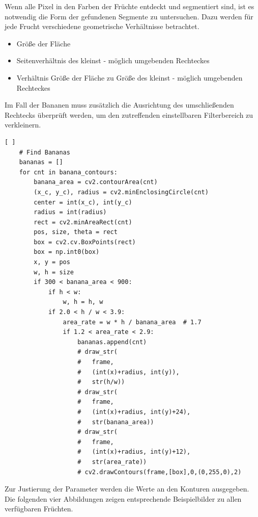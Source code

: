 Wenn alle Pixel in den Farben der Früchte entdeckt und segmentiert sind, ist es notwendig die Form der gefundenen Segmente zu untersuchen. Dazu werden für jede Frucht verschiedene geometrische Verhältnisse betrachtet.
\begin{itemize}
    \item Größe der Fläche
    \item Seitenverhältnis des kleinst - möglich umgebenden Rechteckes
    \item Verhältnis Größe der Fläche zu Größe des kleinst - möglich umgebenden Rechteckes
\end{itemize}
Im Fall der Bananen muss zusätzlich die Ausrichtung des umschließenden Rechtecks überprüft werden, um den zutreffenden einstellbaren Filterbereich zu verkleinern. 

\lstset{language=Python}
\begin{lstlisting}[ ]
    # Find Bananas
    bananas = []
    for cnt in banana_contours:
        banana_area = cv2.contourArea(cnt)
        (x_c, y_c), radius = cv2.minEnclosingCircle(cnt)
        center = int(x_c), int(y_c)
        radius = int(radius)
        rect = cv2.minAreaRect(cnt)
        pos, size, theta = rect
        box = cv2.cv.BoxPoints(rect)
        box = np.int0(box)
        x, y = pos
        w, h = size
        if 300 < banana_area < 900:
            if h < w:
                w, h = h, w
            if 2.0 < h / w < 3.9:
                area_rate = w * h / banana_area  # 1.7
                if 1.2 < area_rate < 2.9:
                    bananas.append(cnt)
                    # draw_str(
                    #   frame,
                    #   (int(x)+radius, int(y)),
                    #   str(h/w))
                    # draw_str(
                    #   frame,
                    #   (int(x)+radius, int(y)+24),
                    #   str(banana_area))
                    # draw_str(
                    #   frame,
                    #   (int(x)+radius, int(y)+12),
                    #   str(area_rate))
                    # cv2.drawContours(frame,[box],0,(0,255,0),2)
\end{lstlisting}

Zur Justierung der Parameter werden die Werte an den Konturen ausgegeben. Die folgenden vier Abbildungen zeigen entsprechende Beispielbilder zu allen verfügbaren Früchten. 

